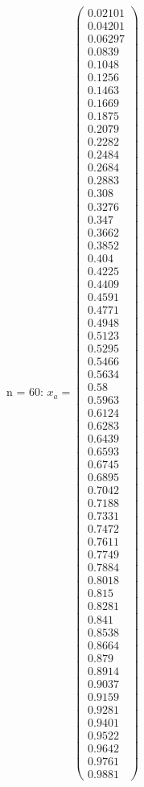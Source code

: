 \documentclass{udpreport}
\begin{document}
\begin{enumerate}
\begin{enumerate}
\begin{itemize}
\begin{itemize}
				n = 60: $x_{a} = \left(\begin{array}{c} 0.02101\\ 0.04201\\ 0.06297\\ 0.0839\\ 0.1048\\ 0.1256\\ 0.1463\\ 0.1669\\ 0.1875\\ 0.2079\\ 0.2282\\ 0.2484\\ 0.2684\\ 0.2883\\ 0.308\\ 0.3276\\ 0.347\\ 0.3662\\ 0.3852\\ 0.404\\ 0.4225\\ 0.4409\\ 0.4591\\ 0.4771\\ 0.4948\\ 0.5123\\ 0.5295\\ 0.5466\\ 0.5634\\ 0.58\\ 0.5963\\ 0.6124\\ 0.6283\\ 0.6439\\ 0.6593\\ 0.6745\\ 0.6895\\ 0.7042\\ 0.7188\\ 0.7331\\ 0.7472\\ 0.7611\\ 0.7749\\ 0.7884\\ 0.8018\\ 0.815\\ 0.8281\\ 0.841\\ 0.8538\\ 0.8664\\ 0.879\\ 0.8914\\ 0.9037\\ 0.9159\\ 0.9281\\ 0.9401\\ 0.9522\\ 0.9642\\ 0.9761\\ 0.9881 \end{array}\right)$
				

\end{itemize}
\end{itemize}
\end{enumerate}
\end{enumerate}
\end{document}
